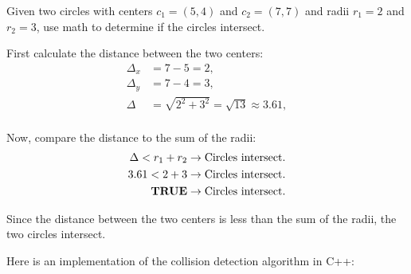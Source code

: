 Given two circles with centers $c_1 = (5, 4)$ and $c_2 = (7, 7)$ and radii $r_1
    = 2$ and $r_2 = 3$, use math to determine if the circles intersect.

First calculate the distance between the two centers:
\begin{equation*}
    \begin{aligned}
        \Delta_x & = 7 - 5 = 2,                                 \\
        \Delta_y & = 7 - 4 = 3,                                 \\
        \Delta   & = \sqrt{2^2 + 3^2} = \sqrt{13} \approx 3.61, \\
    \end{aligned}
\end{equation*}

Now, compare the distance to the sum of the radii:
\begin{equation*}
    \begin{aligned}
        \Delta < r_1 + r_2         & \rightarrow \textnormal{Circles intersect.} \\
        3.61 < 2 + 3               & \rightarrow \textnormal{Circles intersect.} \\
        \textnormal{\textbf{TRUE}} & \rightarrow \textnormal{Circles intersect.} \\
    \end{aligned}
\end{equation*}

Since the distance between the two centers is less than the sum of the radii,
the two circles intersect.

\newpage
{}
Here is an implementation of the collision detection algorithm in C++:
\vspace{1em}
\begin{mdframed}[linecolor=black!30!white,linewidth=.5pt,extratopheight=3em]
    
\end{mdframed}

\newpage
